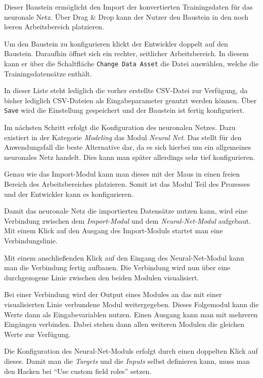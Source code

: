 Dieser Baustein ermöglicht den Import der konvertierten Trainingsdaten für das neuronale Netz. Über Drag \& Drop kann
der Nutzer den Baustein in den noch leeren Arbeitsbereich platzieren.

Um den Baustein zu konfigurieren klickt der Entwickler doppelt auf den Baustein. Daraufhin öffnet sich ein rechter,
seitlicher Arbeitsbereich. In diesem kann er über die Schaltfläche \texttt{Change Data Asset} die Datei auswählen,
welche die Trainingsdatensätze enthält.

In dieser Liste steht lediglich die vorher erstellte CSV-Datei zur Verfügung, da bisher lediglich CSV-Dateien als
Eingabeparameter genutzt werden können. Über \texttt{Save} wird die Einstellung gespeichert und der Baustein ist fertig
konfiguriert.

Im nächsten Schritt erfolgt die Konfiguration des neuronalen Netzes. Dazu existiert in der Kategorie \textit{Modeling}
das Modul \textit{Neural Net}. Das stellt für den Anwendungsfall die beste Alternative dar, da es sich hierbei um ein
allgemeines neuronales Netz handelt. Dies kann man später allerdings sehr tief konfigurieren.

Genau wie das Import-Modul kann man dieses mit der Maus in einen freien Bereich des Arbeitsbereiches platzieren. Somit
ist das Modul Teil des Prozesses und der Entwickler kann es konfigurieren.

Damit das neuronale Netz die importierten Datensätze nutzen kann, wird eine Verbindung zwischen dem
\textit{Import-Modul} und dem \textit{Neural-Net-Modul} aufgebaut. Mit einem Klick auf den Ausgang des Import-Moduls
startet man eine Verbindungslinie.

Mit einem anschließenden Klick auf den Eingang des Neural-Net-Modul kann man die Verbindung fertig aufbauen. Die
Verbindung wird nun über eine durchgezogene Linie zwischen den beiden Modulen visualisiert.

Bei einer Verbindung wird der Output eines Modules an das mit einer visualisierten Linie verbundene Modul
weitergegeben. Dieses Folgemodul kann die Werte dann als Eingabevariablen nutzen. Einen Ausgang kann man mit mehreren
Eingängen verbinden. Dabei stehen dann allen weiteren Modulen die gleichen Werte zur Verfügung.

Die Konfiguration des Neural-Net-Moduls erfolgt durch einen doppelten Klick auf dieses. Damit man die
\textit{Targets} und die \textit{Inputs} selbst definieren kann, muss man den Hacken bei
\enquote{Use custom field roles} setzen.


